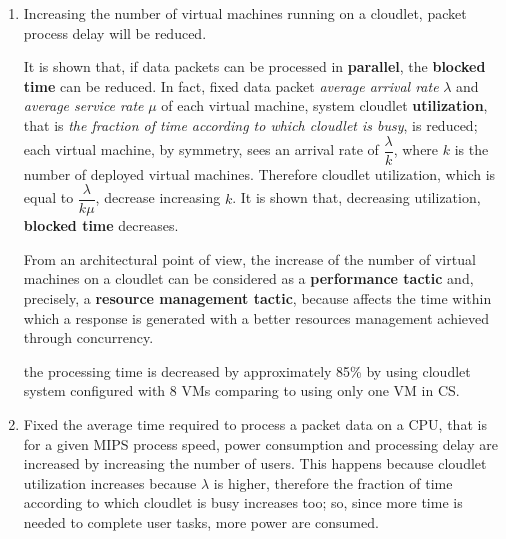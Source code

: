 \documentclass[sigchi]{acmart}
\begin{document}
\begin{enumerate}

\item Increasing the number of virtual machines running on a cloudlet, packet process delay will be reduced.

It is shown that, if data packets can be processed in \textbf{parallel}, the \textbf{blocked time} can be reduced. In fact, fixed data packet \textit{average arrival rate} $\lambda$ and \textit{average service rate} $\mu$ of each virtual machine, system cloudlet \textbf{utilization}, that is \textit{the fraction of time according to which cloudlet is busy}, is reduced; each virtual machine, by symmetry, sees an arrival rate of $\dfrac{\lambda}{k}$, where $k$ is the number of deployed virtual machines. Therefore cloudlet utilization, which is equal to $\dfrac{\lambda}{k\mu}$, decrease increasing $k$. It is shown that, decreasing utilization, \textbf{blocked time} decreases.\cite{BassSoftwareArchitecture2003}

From an architectural point of view, the increase of the number of virtual machines on a cloudlet can be considered as a \textbf{performance tactic} and, precisely, a \textbf{resource management tactic}, because affects the time within which a response is generated with a better resources management achieved through concurrency.\cite{BassSoftwareArchitecture2003}

\vspace{0.3cm}

\begin{quoting}[font=itshape, begintext={``}, endtext={''\cite[par.~3.3]{MSAReport}}]
the processing time is decreased by approximately 85\% by using cloudlet system configured with 8 VMs comparing to using only one VM in CS.
\end{quoting}

\vspace{0.3cm}

\item Fixed the average time required to process a packet data on a CPU, that is for a given MIPS process speed, power consumption and processing delay are increased by increasing the number of users. This happens because cloudlet utilization increases because $\lambda$ is higher, therefore the fraction of time according to which cloudlet is busy increases too; so, since more time is needed to complete user tasks, more power are consumed.

\end{enumerate}
\end{document}
